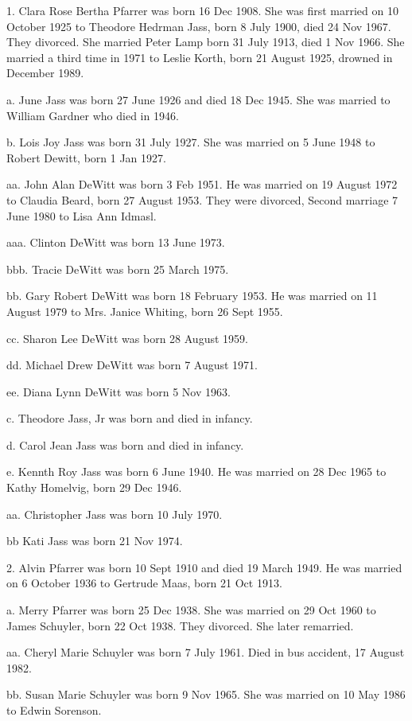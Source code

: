\documentclass[a4paper]{article}
\begin{document}
1. Clara Rose Bertha Pfarrer was born 16 Dec 1908.  She was first married on 10 October 1925 to Theodore Hedrman Jass, born 8 July 1900, died 24 Nov 1967.  They divorced.  She married Peter Lamp born 31 July 1913, died 1 Nov 1966.  She married a third time in 1971 to Leslie Korth, born 21 August 1925, drowned  in December 1989.  

a. June Jass was born 27 June 1926 and died 18 Dec 1945.  She was married to William Gardner who died in 1946.

b. Lois Joy Jass was born 31 July 1927.  She was married on 5 June 1948 to Robert Dewitt, born 1 Jan 1927.

aa. John Alan DeWitt was born 3 Feb 1951.  He was married on 19 August 1972 to Claudia Beard, born 27 August 1953.  They were divorced, Second marriage 7 June 1980 to Lisa Ann Idmasl.

aaa. Clinton DeWitt was born 13 June 1973.

bbb. Tracie DeWitt was born 25 March 1975.

bb. Gary Robert DeWitt was born 18 February 1953.  He was married on 11 August 1979 to Mrs. Janice Whiting, born 26 Sept 1955.  

cc. Sharon Lee DeWitt was born 28 August 1959.

dd. Michael Drew DeWitt was born 7 August 1971.

ee. Diana Lynn DeWitt was born 5 Nov 1963.  

c. Theodore Jass, Jr was born and died in infancy.

d. Carol Jean Jass was born and died in infancy.

e. Kennth Roy Jass was born 6 June 1940.  He was married on 28 Dec 1965 to Kathy Homelvig, born 29 Dec 1946.

aa. Christopher Jass was born 10 July 1970.

bb Kati Jass was born 21 Nov 1974.

2. Alvin Pfarrer was born 10 Sept 1910 and died 19 March 1949.  He was married on 6 October 1936 to Gertrude Maas, born 21 Oct 1913.  

a. Merry Pfarrer was born 25 Dec 1938.   She was married on 29 Oct 1960 to James Schuyler, born 22 Oct 1938.  They divorced.  She later remarried.

aa. Cheryl Marie Schuyler was born 7 July 1961.  Died in bus accident, 17 August 1982.

bb. Susan Marie Schuyler was born 9 Nov 1965.  She was married on 10 May 1986 to Edwin Sorenson.
\end{document}
